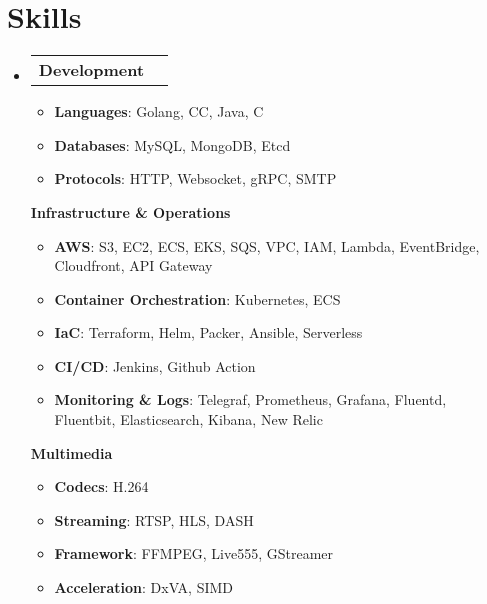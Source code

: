\documentclass[letterpaper,11pt]{article}
\makeatletter
\newcommand{\resumeItem}[1]{
  \item\small{
    {#1 \vspace{-2pt}}
  }
}
\newcommand{\resumeProjectHeading}[1]{
    \item
    \begin{tabular*}{1.001\textwidth}{l@{\extracolsep{\fill}}r}
      \small#1 \\
    \end{tabular*}\vspace{-7pt}
}
\newcommand{\resumeSubHeadingListStart}{\begin{itemize}[leftmargin=0.0in, label={}]}
\newcommand{\resumeSubHeadingListEnd}{\end{itemize}}
\newcommand{\resumeItemListStart}{\begin{itemize}}
\newcommand{\resumeItemListEnd}{\end{itemize}}
\newcommand{\CC}{C\nolinebreak\raisebox{.4ex}{\scriptsize\bf /}C\nolinebreak\hspace{-.05em}\raisebox{.4ex}{\tiny\bf ++}}
\newcommand{\CSHARP}{C\nolinebreak\hspace{-.05em}\raisebox{.4ex}{\tiny\bf \#}}
\makeatother
\begin{document}
\section{Skills}
    \vspace{-5pt}
    \resumeSubHeadingListStart
        \resumeProjectHeading
          {\textbf{Development}}
          \resumeItemListStart
            \resumeItem{\textbf{Languages}{: Golang, \CC, Java, \CSHARP}}
            \resumeItem{\textbf{Databases}{: MySQL, MongoDB, Etcd}}
            \resumeItem{\textbf{Protocols}{: HTTP, Websocket, gRPC, SMTP}}
          \resumeItemListEnd
          {\textbf{Infrastructure \& Operations}}
          \vspace{-8pt}
          \resumeItemListStart
            \resumeItem{\textbf{AWS}{: S3, EC2, ECS, EKS, SQS, VPC, IAM, Lambda, EventBridge, Cloudfront, API Gateway}}
            \resumeItem{\textbf{Container Orchestration}{: Kubernetes, ECS}}
            \resumeItem{\textbf{IaC}{: Terraform, Helm, Packer, Ansible, Serverless}}
            \resumeItem{\textbf{CI/CD}{: Jenkins, Github Action}}
            \resumeItem{\textbf{Monitoring \& Logs}{: Telegraf, Prometheus, Grafana, Fluentd, Fluentbit, Elasticsearch, Kibana, New Relic}}
          \resumeItemListEnd
          {\textbf{Multimedia}}
          \vspace{-8pt}
          \resumeItemListStart
            \resumeItem{\textbf{Codecs}{: H.264}}
            \resumeItem{\textbf{Streaming}{: RTSP, HLS, DASH}}
            \resumeItem{\textbf{Framework}{: FFMPEG, Live555, GStreamer}}
            \resumeItem{\textbf{Acceleration}{: DxVA, SIMD}}
          \resumeItemListEnd
    \resumeSubHeadingListEnd

\vspace{-10pt}
\end{document}
